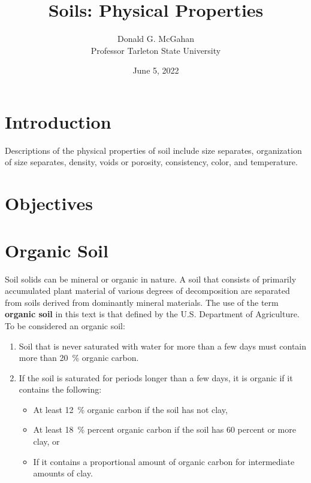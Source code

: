 \documentclass[a5paper]{report}
\title{Soils: Physical Properties}
\author{Donald G. McGahan\\ Professor Tarleton State University}
\date{June 5, 2022}
\begin{document}
\maketitle

\section{Introduction}
\label{introduction}

Descriptions of the physical properties of soil include size separates, organization of size separates, density, voids or porosity, consistency, color, and temperature.

\section{Objectives}
\label{objectives}



    
\section{Organic Soil}
\label{organic_soil}
    
Soil solids can be mineral or organic in nature. A soil that consists of primarily accumulated plant material of various degrees of decomposition are separated from soils derived from dominantly mineral materials. The use of the term \textbf{organic soil} in this text is that defined by the U.S. Department of Agriculture. To be considered an organic soil:
    
\begin{enumerate}
    \item Soil that is never saturated with water for more than a few days must contain more than \qty{20}{\percent} organic carbon.
    \item If the soil is saturated for periods longer than a few days, it is organic if it contains the following:
    \begin{itemize}
        \item At least \qty{12}{\percent} organic carbon if the soil has not clay,
        \item At least \qty{18}{\percent} percent organic carbon if the soil has 60 percent or more clay, or
        \item If it contains a proportional amount of organic carbon for intermediate amounts of clay.
    \end{itemize}
\end{enumerate}
    
\end{document}
